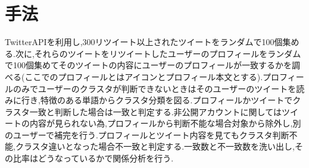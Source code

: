 \documentclass[uplatex,twocolumn,dvipdfmx]{jsarticle}
\begin{document}
\section{手法}
TwitterAPIを利用し,300リツイート以上されたツイートをランダムで100個集める.次に,それらのツイートをリツイートしたユーザーのプロフィールをランダムで100個集めてそのツイートの内容にユーザーのプロフィールが一致するかを調べる(ここでのプロフィールとはアイコンとプロフィール本文とする)\cite{soturon2014}.プロフィールのみでユーザーのクラスタが判断できないときはそのユーザーのツイートを読みに行き,特徴のある単語からクラスタ分類を図る.プロフィールかツイートでクラスタ一致と判断した場合は一致と判定する.非公開アカウントに関してはツイートの内容が見られない為,プロフィールから判断不能な場合対象から除外し,別のユーザーで補完を行う.プロフィールとツイート内容を見てもクラスタ判断不能,クラスタ違いとなった場合不一致と判定する.一致数と不一致数を洗い出し,その比率はどうなっているかで関係分析を行う.



\end{document}
